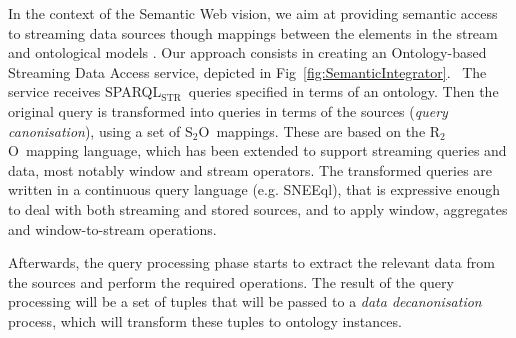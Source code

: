 \documentclass[runningheads,a4paper]{llncs}
\newcommand{\subscript}[1]{\ensuremath{_{\textrm{#1}}}}
\newcommand{\rtwoo}{\textsf{R\subscript{2}O}}
\newcommand{\stwoo}{\textsf{S\subscript{2}O}}
\newcommand{\sparqlstr}{SPARQL\subscript{STR}}
\begin{document}

In the context of the Semantic Web vision, we aim at providing semantic access to streaming data sources though mappings between the elements in the stream and ontological models \cite{Sahoo_09}. Our approach consists in creating an Ontology-based Streaming Data Access service, depicted in Fig~\ref{fig:SemanticIntegrator}.\ %
The service receives \sparqlstr\ queries specified in terms of 
an ontology.
Then the original query is transformed into queries in terms of the sources (\textit{query canonisation}), using 
a set of \stwoo\ mappings. These are based on the \rtwoo\ mapping language, which has been extended to support  streaming queries and data, most notably window and stream operators. 
The transformed queries are written in a continuous query language (e.g. SNEEql), that is expressive enough to deal with both streaming and stored sources, and to apply window, aggregates and window-to-stream operations.

Afterwards, the query processing phase starts %
to extract the relevant data from the sources and perform the required operations.
%
The result of the query processing will be a set of tuples that will be passed to a \textit{data decanonisation} process, which will transform these tuples to ontology instances.
\end{document}

